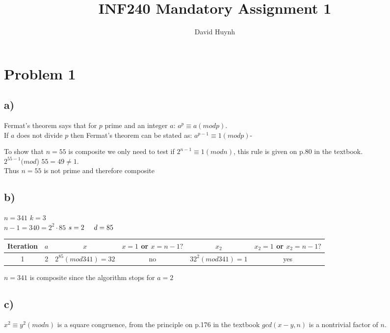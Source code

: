 \documentclass{article}
\begin{document}
\title{INF240 Mandatory Assignment 1}
\author{David Huynh}

\maketitle

\section*{Problem 1}

\subsection*{a)}
Fermat's theorem says that for $p$ prime and an integer $a$: $a^{p} \equiv a (mod p)$.\\
If $a$ does not divide $p$ then Fermat's theorem can be stated as: $a^{p-1} \equiv 1 (mod p)$-

To show that $n=55$ is composite we only need to test if $2^{n-1}
\equiv 1 (modn)$, this rule is given on p.80 in the textbook.\\
$2^{55-1} (mod$) $55 = 49 \neq 1$.\\
Thus $n=55$ is not prime and therefore composite

\subsection*{b)}

$n=341$ \hspace{5 mm} $k=3$\\
$n-1=340= 2^{2} \cdotp 85$ \hspace{5 mm} $s=2 \hspace{5mm} d=85$

\begin{tabular}{c | c | c | c | c | c}
Iteration & $a$ & $x$ & $x=1$ or $x=n-1?$ & $x_{2}$ & $x_{2}=1$ or $x_{2}=n-1?$\\ \hline

1 & 2 & $2^{85} (mod 341) = 32$ & no & $32^{2} (mod 341) = 1$ & yes\\
\end{tabular}

$n=341$ is composite since the algorithm stops for $a=2$

\subsection*{c)}

$x^{2} \equiv y^{2} (mod n)$ is a square congruence, from the principle on p.176 in the textbook $gcd(x-y,n)$ is a nontrivial factor of $n$.
\end{document}
